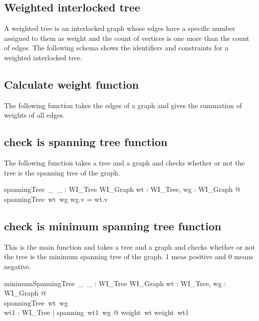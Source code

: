 \documentclass{article}
\begin{document}
\subsection*{Weighted interlocked tree}
A weighted tree is an interlocked graph whose edges have a specific number assigned to them as weight and the count of vertices is one more than the count of edges. The following schema shows the identifiers and constraints for a weighted interlocked tree.

\subsection*{Calculate weight function}
The following function takes the edges of a graph and gives the summation of weights of all edges.

\subsection*{check is spanning tree function}
The following function takes a tree and a graph and checks whether or not the tree is the spanning tree of the graph.
\begin{axdef}
  spanningTree~\_~\_ : WI\_Tree \cross WI\_Graph
\where
  \forall wt : WI\_Tree, wg : WI\_Graph @ \\
  spanningTree~wt~wg \iff wg.v = wt.v
\end{axdef}

\subsection*{check is minimum spanning tree function}
This is the main function and takes a tree and a graph and checks whether or not the tree is the minimum spanning tree of the graph. 1 meas positive and 0 means negative.
\begin{axdef}
  minimumSpanningTree~\_~\_ : WI\_Tree \cross WI\_Graph
\where
  \forall wt : WI\_Tree, wg : WI\_Graph @ \\
  spanningTree~wt~wg \iff \\ \forall wt1 : WI\_Tree | spanning~wt1~wg @ weight~wt \leq weight~wt1
\end{axdef}
\end{document}
